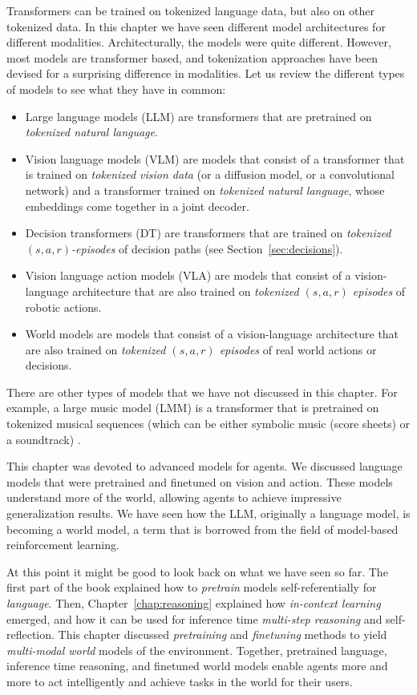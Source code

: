 Transformers can be trained on tokenized language data, but also on other tokenized data. In this chapter we have seen different model architectures for different modalities. Architecturally, the models were quite different.  However, most models are transformer based, and tokenization approaches have been devised for a surprising difference in modalities.  Let us review the different types of models to see what they have in common:
\begin{itemize}
    \item  Large language models (LLM) are transformers that are pretrained on {\em tokenized natural language}.
    \item Vision language models (VLM) are models that consist of a transformer that is trained on {\em tokenized vision data} (or a diffusion model, or a convolutional network) and a transformer trained on {\em tokenized natural language}, whose embeddings come together in a joint decoder.
    \item Decision transformers (DT) are transformers that are trained on {\em tokenized $(s,a,r)$-episodes} of decision paths (see Section~\ref{sec:decisions}).
    \item Vision language action models (VLA) are models that consist of a vision-language architecture that are also trained on {\em tokenized $(s,a,r)$ episodes} of robotic actions.
    \item World models are models that consist of a vision-language architecture that are also trained on {\em tokenized $(s,a,r)$ episodes} of real world actions or decisions. 
\end{itemize}
There are other types of models that we have not discussed in this chapter. For example, a large music model (LMM) is a transformer that is pretrained on tokenized musical sequences (which can be either symbolic music (score sheets) or a soundtrack) \citep{yuan2025yue}.

This chapter was devoted to advanced models for agents. We discussed language models that were pretrained and finetuned on vision and action. These models understand more of the world, allowing agents to achieve impressive generalization results. We have seen how the LLM, originally a language model, is becoming a world model, a term that is borrowed from the field of model-based reinforcement learning. 

At this point it might be good to look back on what we have seen so far.
The first part of the book explained how to {\em pretrain} models self-referentially for {\em language}. Then, Chapter~\ref{chap:reasoning} explained how {\em in-context learning} emerged, and how it can be used for inference time  {\em multi-step reasoning} and self-reflection. This chapter discussed {\em pretraining} and {\em finetuning} methods to yield {\em multi-modal world} models of the environment. Together, pretrained language, inference time reasoning, and finetuned world models enable agents more and more to act intelligently and achieve tasks in the world for their users. %

